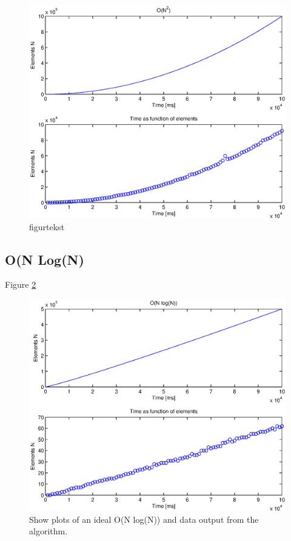 \begin{figure}[th!]
\centering
\includegraphics[width=1\textwidth]{./graphics/test1.eps}
\caption[tekst i indholdsfortegnelsen]{figurtekst}
\label{fig:}
\end{figure}
\newpage


\subsection{O(N Log(N)}
Figure \ref{fig:test2}


\begin{figure}[th!]
\centering
\includegraphics[width=1\textwidth]{./graphics/test2.eps}
\caption{Show plots of an ideal O(N log(N)) and data output from the algorithm.}
\label{fig:test2}
\end{figure}
